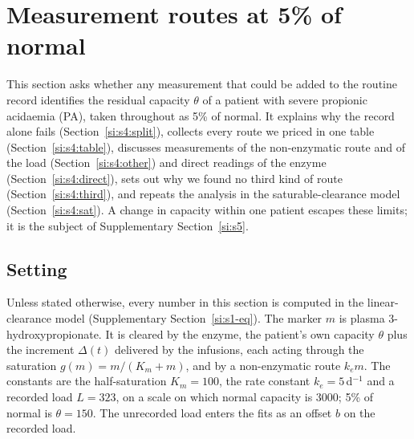 \section{Measurement routes at 5\% of normal}
\label{si:s4}

This section asks whether any measurement that could be added to the routine record
identifies the residual capacity $\theta$ of a patient with severe propionic acidaemia (PA),
taken throughout as 5\% of normal. It explains why the record alone fails
(Section~\ref{si:s4:split}), collects every route we priced in one table
(Section~\ref{si:s4:table}), discusses measurements of the non-enzymatic route and of the load
(Section~\ref{si:s4:other}) and direct readings of the enzyme (Section~\ref{si:s4:direct}),
sets out why we found no third kind of route (Section~\ref{si:s4:third}), and repeats the
analysis in the saturable-clearance model (Section~\ref{si:s4:sat}). A change in capacity
within one patient escapes these limits; it is the subject of
Supplementary Section~\ref{si:s5}.

\subsection{Setting}
\label{si:s4:setting}

Unless stated otherwise, every number in this section is computed in the linear-clearance
model (Supplementary Section~\ref{si:s1-eq}). The marker $m$ is plasma 3-hydroxypropionate.
It is cleared by the enzyme, the patient's own capacity $\theta$ plus the increment
$\Delta(t)$ delivered by the infusions, each acting through the saturation
$g(m)=m/(K_m+m)$, and by a non-enzymatic route $k_e m$. The constants are the half-saturation
$K_m=100$\uM, the rate constant $k_e=5$\,d$^{-1}$ and a recorded load $L=323$\um, on a scale on
which normal capacity is 3000\um; 5\% of normal is $\theta=150$\um. The unrecorded load enters
the fits as an offset $b$ on the recorded load.

